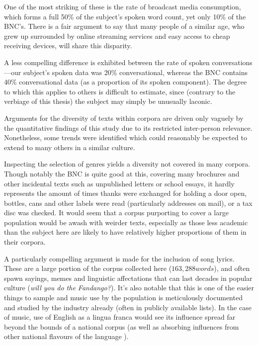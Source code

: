 One of the most striking of these is the rate of broadcast media consumption, which forms a full 50\% of the subject's spoken word count, yet only 10\% of the BNC's.  There is a fair argument to say that many people of a similar age, who grew up surrounded by online streaming services and easy access to cheap receiving devices, will share this disparity.

A less compelling difference is exhibited between the rate of spoken conversations---our subject's spoken data was 20\% conversational, whereas the BNC contains 40\% conversational data (as a proportion of its spoken component).  The degree to which this applies to others is difficult to estimate, since (contrary to the verbiage of this thesis) the subject may simply be unusually laconic.



Arguments for the diversity of texts within corpora are driven only vaguely by the quantitative findings of this study due to its restricted inter-person relevance.  Nonetheless, some trends were identified which could reasonably be expected to extend to many others in a similar culture.

Inspecting the selection of genres yields a diversity not covered in many corpora.  Though notably the BNC is quite good at this, covering many brochures and other incidental texts such as unpublished letters or school essays, it hardly represents the amount of times thanks were exchanged for holding a door open, bottles, cans and other labels were read (particularly addresses on mail), or a tax disc was checked.  It would seem that a corpus purporting to cover a large population would be awash with weirder texts, especially as those less academic than the subject here are likely to have relatively higher proportions of them in their corpora.

A particularly compelling argument is made for the inclusion of song lyrics.  These are a large portion of the corpus collected here  ($163,288 words$), and often spawn sayings, memes and linguistic affectations that can last decades in popular culture (\textit{will you do the Fandango?}).  It's also notable that this is one of the easier things to sample and music use by the population is meticulously documented and studied by the industry already (often in publicly available lists).  In the case of music, use of English as a lingua franca would see its influence spread far beyond the bounds of a national corpus (as well as absorbing influences from other national flavours of the language%
).









